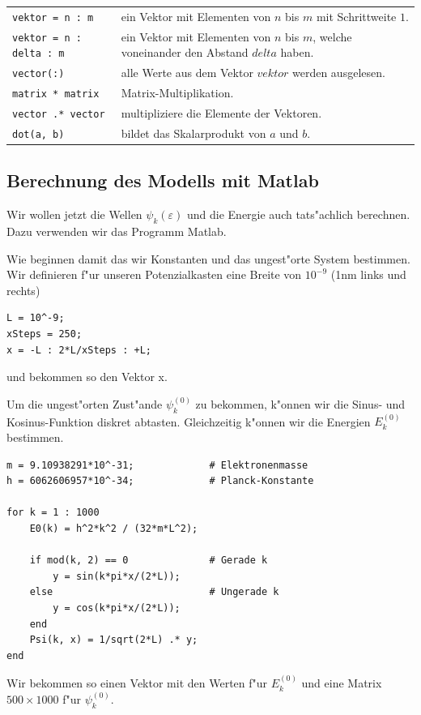 \begin{refsection}
\begin{center}
	\begin{tabular}{lp{9cm}}
		\verb|vektor = n : m| & ein Vektor mit Elementen von $n$ bis $m$ mit Schrittweite $1$. \\
		\verb|vektor = n : delta : m| & ein Vektor mit Elementen von $n$ bis $m$, welche voneinander den Abstand $delta$ haben. \\
		\verb|vector(:)| & alle Werte aus dem Vektor $vektor$ werden ausgelesen. \\
		\verb|matrix * matrix| & Matrix-Multiplikation. \\
		\verb|vector .* vector| & multipliziere die Elemente der Vektoren. \\
		\verb|dot(a, b)| & bildet das Skalarprodukt von $a$ und $b$.
	\end{tabular}
\end{center}




\subsection{Berechnung des Modells mit Matlab}

Wir wollen jetzt die Wellen $\psi_k(\varepsilon)$ und die Energie auch tats"achlich berechnen.
Dazu verwenden wir das Programm Matlab.

Wie beginnen damit das wir Konstanten und das ungest"orte System bestimmen.
Wir definieren f"ur unseren Potenzialkasten eine Breite von $10^{-9}$ (1nm links und rechts)
\begin{lstlisting}[style=Matlab]
L = 10^-9;
xSteps = 250;
x = -L : 2*L/xSteps : +L;
\end{lstlisting}
und bekommen so den Vektor x.

Um die ungest"orten Zust"ande $\psi_k^{(0)}$ zu bekommen, k"onnen wir die Sinus- und Kosinus-Funktion diskret abtasten.
Gleichzeitig k"onnen wir die Energien $E_k^{(0)}$ bestimmen.
\begin{lstlisting}[style=Matlab]
m = 9.10938291*10^-31;             # Elektronenmasse
h = 6062606957*10^-34;             # Planck-Konstante

for k = 1 : 1000
    E0(k) = h^2*k^2 / (32*m*L^2);
    
    if mod(k, 2) == 0              # Gerade k
        y = sin(k*pi*x/(2*L));
    else                           # Ungerade k
        y = cos(k*pi*x/(2*L));
    end
    Psi(k, x) = 1/sqrt(2*L) .* y;
end
\end{lstlisting}
Wir bekommen so einen Vektor mit den Werten f"ur $E_k^{(0)}$
und eine Matrix $500 \times 1000$ f"ur $\psi_k^{(0)}$.


\end{refsection}
